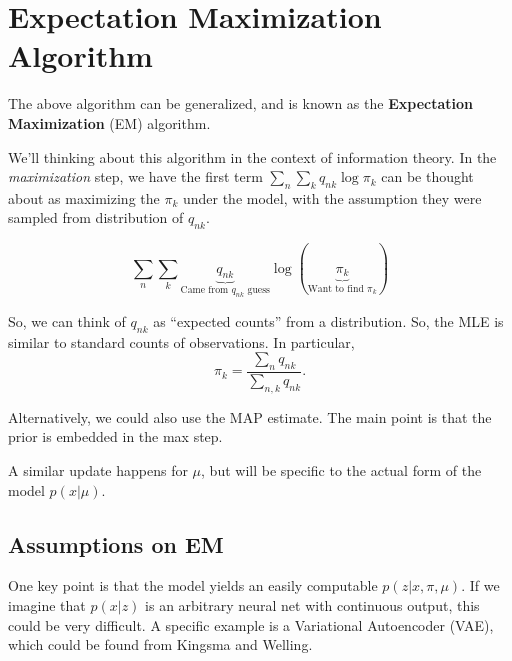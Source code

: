 \documentclass{article}
\begin{document}
\section{Expectation Maximization Algorithm}

The above algorithm can be generalized, and is known as the {\bf Expectation Maximization} (EM) algorithm.



\begin{algorithm}[H]
\begin{algorithmic}[1]
  \EndWhile{}
  \EndProcedure{}
\end{algorithmic}
\end{algorithm}


We'll thinking about this algorithm in the context of information theory.  In the \emph{maximization} step, we have the first term $\displaystyle \sum_n \sum_k q_{nk} \log \pi_k$ can be thought about as maximizing the $\pi_k$ under the model, with the assumption they were sampled from distribution of $q_{nk}$. 

\[\sum_n \sum_k \underbrace{{q_{nk}}}_{\text{Came from $q_{nk}$ guess}} \log \left(\underbrace{{\pi_k}}_{\text{Want to find $\pi_k$}}\right) \]

So, we can think of $q_{nk}$ as ``expected counts'' from a distribution.  So, the MLE is similar to standard counts of observations.  In particular,
\[ \pi_k = \frac{\sum\limits_n q_{nk}}{\sum\limits_{n, k} q_{nk}}. \]

Alternatively, we could also use the MAP estimate.  The main point is that the prior is embedded in the max step.

A similar update happens for $\mu$, but will be specific to the actual form of the model $p(x | \mu)$.

\subsection{Assumptions on EM}

One key point is that the model yields an easily computable $p(z | x, \pi, \mu)$.  If we imagine that $p(x|z)$ is an arbitrary neural net with continuous output, this could be very difficult.  A specific example is a Variational Autoencoder (VAE), which could be found from Kingsma and Welling.
\end{document}
